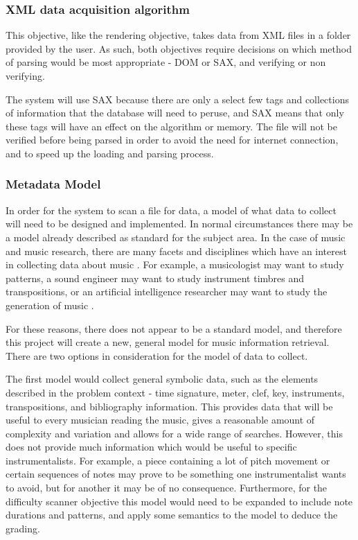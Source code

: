 \subsubsection{XML data acquisition algorithm}
This objective, like the rendering objective, takes data from XML files in a folder provided by the user. As such, both objectives require decisions on which method of parsing would be most appropriate - DOM or SAX, and verifying or non verifying.

The system will use SAX because there are only a select few tags and collections of information that the database will need to peruse, and SAX means that only these tags will have an effect on the algorithm or memory.
The file will not be verified before being parsed in order to avoid the need for internet connection, and to speed up the loading and parsing process.

\subsubsection{Metadata Model}
In order for the system to scan a file for data, a model of what data to collect will need to be designed and implemented. In normal circumstances there may be a model already described as standard for the subject area. In the case of music and music research, there are many facets and disciplines which have an interest in collecting data about music \parencite{MIR}. For example, a musicologist may want to study patterns, a sound engineer may want to study instrument timbres and transpositions, or an artificial intelligence researcher may want to study the generation of music \parencite{creativeMachines}. 

For these reasons, there does not appear to be a standard model, and therefore this project will create a new, general model for music information retrieval.
There are two options in consideration for the model of data to collect.

The first model would collect general symbolic data, such as the elements described in the problem context - time signature, meter, clef, key, instruments, transpositions, and bibliography information. This provides data that will be useful to every musician reading the music, gives a reasonable amount of complexity and variation and allows for a wide range of searches.
However, this does not provide much information which would be useful to specific instrumentalists. For example, a piece containing a lot of pitch movement or certain sequences of notes may prove to be something one instrumentalist wants to avoid, but for another it may be of no consequence.
Furthermore, for the difficulty scanner objective this model would need to be expanded to include note durations and patterns, and apply some semantics to the model to deduce the grading.

